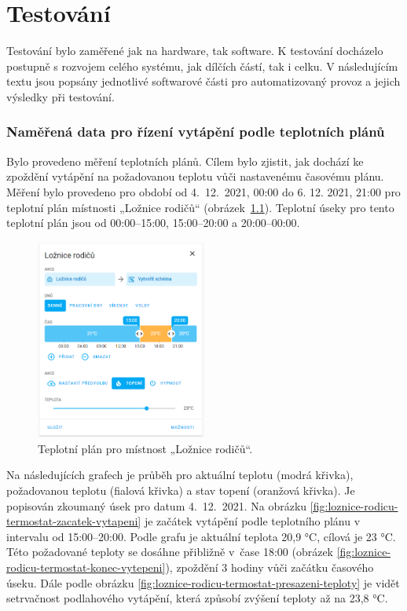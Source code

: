 \chapter{Testování}

Testování bylo zaměřené jak na hardware, tak software. K testování docházelo postupně s rozvojem celého systému, jak dílčích částí, tak i celku. V následujícím textu jsou popsány jednotlivé softwarové části pro automatizovaný provoz a jejich výsledky při testování.

\subsection{Naměřená data pro řízení vytápění podle teplotních plánů}

Bylo provedeno měření teplotních plánů. Cílem bylo zjistit, jak dochází ke zpoždění vytápění na požadovanou teplotu vůči nastavenému časovému plánu. Měření bylo provedeno pro období od 4.~12.~2021, 00:00 do 6. 12. 2021, 21:00 pro teplotní plán místnosti „Ložnice rodičů“ (obrázek~\ref{fig:teplotni-plan-loznice-rodicu}). Teplotní úseky pro tento teplotní plán jsou od 00:00–15:00, 15:00–20:00 a 20:00–00:00.

\begin{figure}[H]
    \centering
    \includegraphics[width=0.5\textwidth]{images/testovani/teplotni-plany/teplotni-plan-loznice-rodicu.png}
    \caption{Teplotní plán pro místnost „Ložnice rodičů“.}
    \label{fig:teplotni-plan-loznice-rodicu}
\end{figure}

Na následujících grafech je průběh pro aktuální teplotu (modrá křivka), požadovanou teplotu (fialová křivka) a stav topení (oranžová křivka). Je popisován zkoumaný úsek pro datum 4.~12.~2021. Na obrázku \ref{fig:loznice-rodicu-termostat-zacatek-vytapeni} je začátek vytápění podle teplotního plánu v intervalu od 15:00–20:00. Podle grafu je aktuální teplota 20,9 °C, cílová je 23 °C. Této požadované teploty se dosáhne přibližně v~čase 18:00 (obrázek \ref{fig:loznice-rodicu-termostat-konec-vytepeni}), zpoždění 3 hodiny vůči začátku časového úseku. Dále podle obrázku \ref{fig:loznice-rodicu-termostat-presazeni-teploty} je vidět setrvačnost podlahového vytápění, která způsobí zvýšení teploty až na 23,8 °C.

